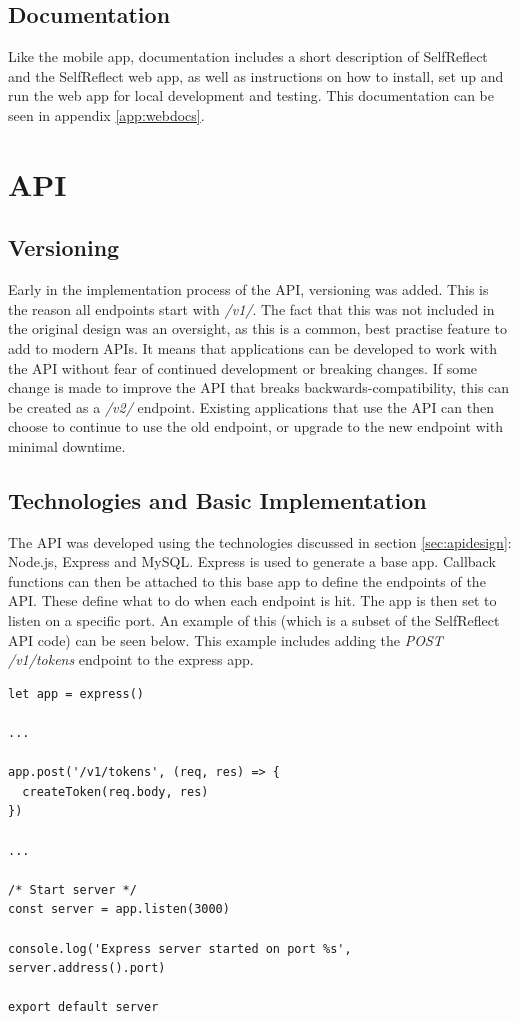\documentclass[11pt,openright,a4paper]{report}
\begin{document}
\subsection{Documentation}
Like the mobile app, documentation includes a short description of SelfReflect and the SelfReflect web app, as well as instructions on how to install, set up and run the web app for local development and testing. This documentation can be seen in appendix \ref{app:webdocs}.

\section{API} \label{sec:apiimpl}
\subsection{Versioning}
Early in the implementation process of the API, versioning was added. This is the reason all endpoints start with \emph{/v1/}. The fact that this was not included in the original design was an oversight, as this is a common, best practise feature to add to modern APIs. It means that applications can be developed to work with the API without fear of continued development or breaking changes. If some change is made to improve the API that breaks backwards-compatibility, this can be created as a \emph{/v2/} endpoint. Existing applications that use the API can then choose to continue to use the old endpoint, or upgrade to the new endpoint with minimal downtime.

\subsection{Technologies and Basic Implementation}
The API was developed using the technologies discussed in section \ref{sec:apidesign}: Node.js, Express and MySQL. Express is used to generate a base app. Callback functions can then be attached to this base app to define the endpoints of the API. These define what to do when each endpoint is hit. The app is then set to listen on a specific port. An example of this (which is a subset of the SelfReflect API code) can be seen below. This example includes adding the \emph{POST /v1/tokens} endpoint to the express app.
\begin{lstlisting}
let app = express()

...

app.post('/v1/tokens', (req, res) => {
  createToken(req.body, res)
})

...

/* Start server */
const server = app.listen(3000)

console.log('Express server started on port %s', server.address().port)

export default server
\end{lstlisting}
\end{document}
